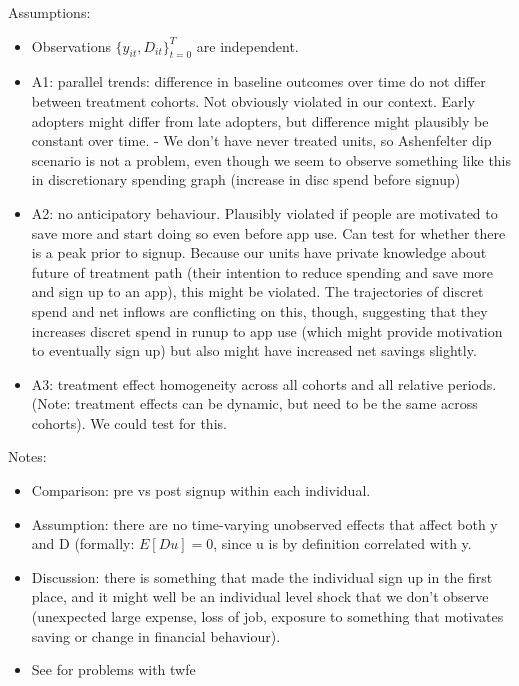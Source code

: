 Assumptions:
\begin{itemize}
    \item Observations $\{y_{it}, D_{it}\}_{t=0}^T$ are independent.

    \item A1: parallel trends: difference in baseline outcomes over time do
        not differ between treatment cohorts. Not obviously violated in our
        context. Early adopters might differ from late adopters, but difference
        might plausibly be constant over time. - We don't have never treated
        units, so Ashenfelter dip scenario is not a problem, even though we
        seem to observe something like this in discretionary spending graph
        (increase in disc spend before signup)

    \item A2: no anticipatory behaviour. Plausibly violated if people are
        motivated to save more and start doing so even before app use. Can test
        for whether there is a peak prior to signup. Because our units have
        private knowledge about future of treatment path (their intention to
        reduce spending and save more and sign up to an app), this might be
        violated. The trajectories of discret spend and net inflows are
        conflicting on this, though, suggesting that they increases discret
        spend in runup to app use (which might provide motivation to eventually
        sign up) but also might have increased net savings slightly.

    \item A3: treatment effect homogeneity across all cohorts and all relative
        periods. (Note: treatment effects can be dynamic, but need to be the
        same across cohorts). We could test for this.

\end{itemize}


Notes:
\begin{itemize}

    \item Comparison: pre vs post signup within each individual.

    \item Assumption: there are no time-varying unobserved effects that affect
        both y and D (formally: $E[Du] = 0$, since u is by definition
        correlated with y.

    \item Discussion: there is something that made the individual sign up in
        the first place, and it might well be an individual level shock that we
        don't observe (unexpected large expense, loss of job, exposure to
        something that motivates saving or change in financial behaviour).

    \item See \citet{imai2021use} for problems with twfe

\end{itemize}

